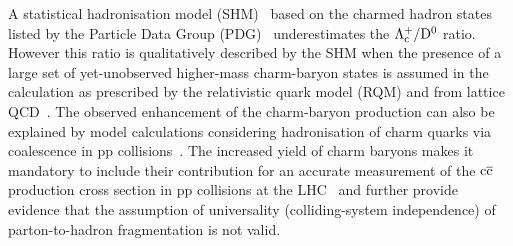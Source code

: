 A statistical hadronisation model (SHM)~\cite{He:2019tik} based on the charmed hadron states listed by the Particle Data Group (PDG)~\cite{Zyla:2020zbs} underestimates the $\Lambda^{+}_{\rm c}/{\rm D^0}$ ratio. However this ratio is qualitatively described by the SHM when the presence of a large set of yet-unobserved higher-mass charm-baryon states is assumed in the calculation as prescribed by the relativistic quark model (RQM) and from lattice QCD~\cite{Ebert:2011kk,Briceno:2012wt}.
The observed enhancement of the charm-baryon production can also be explained by model calculations considering hadronisation of charm quarks via coalescence in pp collisions~\cite{Song:2018tpv}.
The increased yield of charm baryons makes it mandatory to include their contribution for an accurate measurement of the ${\rm c\overline{c}}$ production cross section in pp collisions at the LHC~\cite{Acharya:2017jgo} and further provide evidence that the assumption of universality (colliding-system independence) of parton-to-hadron fragmentation is not valid.

